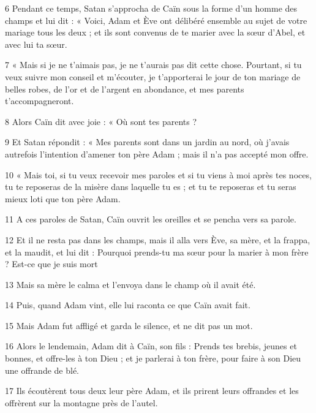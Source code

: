 \par 6 Pendant ce temps, Satan s'approcha de Caïn sous la forme d'un homme des champs et lui dit : « Voici, Adam et Ève ont délibéré ensemble au sujet de votre mariage tous les deux ; et ils sont convenus de te marier avec la sœur d'Abel, et avec lui ta sœur.

\par 7 « Mais si je ne t'aimais pas, je ne t'aurais pas dit cette chose. Pourtant, si tu veux suivre mon conseil et m'écouter, je t'apporterai le jour de ton mariage de belles robes, de l'or et de l'argent en abondance, et mes parents t'accompagneront.

\par 8 Alors Caïn dit avec joie : « Où sont tes parents ?

\par 9 Et Satan répondit : « Mes parents sont dans un jardin au nord, où j'avais autrefois l'intention d'amener ton père Adam ; mais il n'a pas accepté mon offre.

\par 10 « Mais toi, si tu veux recevoir mes paroles et si tu viens à moi après tes noces, tu te reposeras de la misère dans laquelle tu es ; et tu te reposeras et tu seras mieux loti que ton père Adam.

\par 11 A ces paroles de Satan, Caïn ouvrit les oreilles et se pencha vers sa parole.

\par 12 Et il ne resta pas dans les champs, mais il alla vers Ève, sa mère, et la frappa, et la maudit, et lui dit : Pourquoi prends-tu ma sœur pour la marier à mon frère ? Est-ce que je suis mort

\par 13 Mais sa mère le calma et l'envoya dans le champ où il avait été.

\par 14 Puis, quand Adam vint, elle lui raconta ce que Caïn avait fait.

\par 15 Mais Adam fut affligé et garda le silence, et ne dit pas un mot.

\par 16 Alors le lendemain, Adam dit à Caïn, son fils : Prends tes brebis, jeunes et bonnes, et offre-les à ton Dieu ; et je parlerai à ton frère, pour faire à son Dieu une offrande de blé.

\par 17 Ils écoutèrent tous deux leur père Adam, et ils prirent leurs offrandes et les offrèrent sur la montagne près de l'autel.

